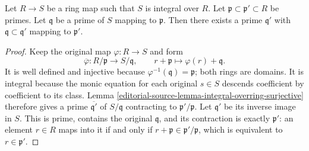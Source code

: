\begin{lemma}
\label{editorial-source-lemma-integral-going-up}
Let $R \to S$ be a ring map such that
$S$ is integral over $R$.
Let $\mathfrak p \subset \mathfrak p' \subset R$
be primes. Let $\mathfrak q$ be a prime of $S$ mapping
to $\mathfrak p$. Then there exists a prime $\mathfrak q'$
with $\mathfrak q \subset \mathfrak q'$
mapping to $\mathfrak p'$.
\end{lemma}

\begin{proof}
Keep the original map $\varphi:R\to S$ and form
$$
\overline\varphi:R/\mathfrak p\longrightarrow S/\mathfrak q,
\qquad r+\mathfrak p\longmapsto\varphi(r)+\mathfrak q.
$$
It is well defined and injective because
$\varphi^{-1}(\mathfrak q)=\mathfrak p$; both rings are domains.
It is integral because the monic equation for each original
$s\in S$ descends coefficient by coefficient to its class.
Lemma \ref{editorial-source-lemma-integral-overring-surjective} therefore gives
a prime $\overline{\mathfrak q'}$ of $S/\mathfrak q$ contracting
to $\mathfrak p'/\mathfrak p$. Let $\mathfrak q'$ be its inverse
image in $S$. This is prime, contains the original $\mathfrak q$,
and its contraction is exactly $\mathfrak p'$: an element $r\in R$
maps into it if and only if $r+\mathfrak p\in\mathfrak p'/\mathfrak p$,
which is equivalent to $r\in\mathfrak p'$.
\end{proof}